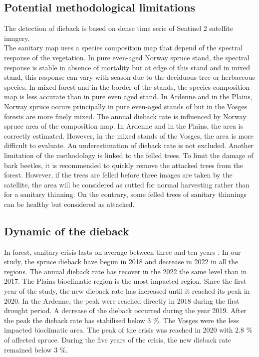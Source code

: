 \documentclass[3p,procedia]{elsarticle}
\begin{document}
\subsection{Potential methodological limitations}
The detection of dieback is based on dense time serie of Sentinel 2 satellite imagery. \\
The sanitary map uses a species composition map that depend of the spectral response of the vegetation.
In pure even-aged Norway spruce stand, the spectral response is stable in absence of mortality but at edge of this stand and in mixed stand, this response can vary with season due to the deciduous tree or herbaceous species.
In mixed forest and in the border of the stands, the species composition map is less accurate than in pure even aged stand.
In Ardenne and in the Plains, Norway spruce occurs principally in pure even-aged stands of  but in the Vosges forests are more finely mixed.
The annual dieback rate is influenced by Norway spruce area of the composition map.
In Ardenne and in the Plains, the area is correctly estimated.
However, in the mixed stands of the  Vosges, the area is more difficult to evaluate.
An underestimation of dieback rate is not excluded.
Another limitation of the methodology is linked to the felled trees.
To limit the damage of bark beetles, it is recommended to quickly remove the attacked trees from the forest.
However, if the trees are felled before three images are taken by the satellite, the area will be considered as cutted for normal harvesting  rather than for a sanitary thinning.
On the contrary, some felled trees of sanitary thinnings can be healthy but considered as attacked.   
 
\subsection{Dynamic of the dieback}
In forest, sanitary crisis lasts on average between three and ten years \citep{brunier_guide_2020}.
In our study, the spruce dieback have begun in 2018 and decrease in 2022 in all the regions.
The annual dieback rate has recover in the 2022 the same level than in 2017.
The Plains bioclimatic region is the most impacted region.
Since the first year of the study, the new dieback rate has increased until it reached its peak in 2020.
In the Ardenne, the peak were reached directly in 2018 during the first drought period.
A decrease of the dieback occurred during the year 2019.
After the peak the dieback rate has stabilised below 3 \%.
The Vosges were the less impacted bioclimatic area. 
The peak of the crisis was reached in 2020 with 2.8 \% of affected spruce.
During the five years of the crisis, the new dieback rate remained below 3 \%.
\end{document}
